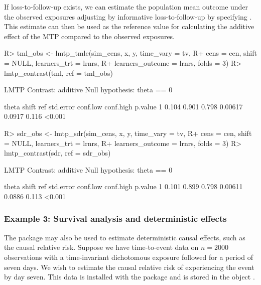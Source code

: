 \documentclass[]{jss}
\begin{document}
If loss-to-follow-up exists, we can estimate the population mean
outcome under the observed exposures adjusting by informative
loss-to-follow-up by specifying . This estimate can
then be used as the reference value for calculating the additive
effect of the MTP compared to the observed exposures.

\begin{CodeChunk}

\begin{CodeInput}
R> tml_obs <- lmtp_tmle(sim_cens, x, y, time_vary = tv, 
R+                      cens = cen, shift = NULL, learners_trt = lrnrs, 
R+                      learners_outcome = lrnrs, folds = 3)
R> lmtp_contrast(tml, ref = tml_obs)
\end{CodeInput}

\begin{CodeOutput}
  LMTP Contrast: additive
Null hypothesis: theta == 0

  theta shift   ref std.error conf.low conf.high p.value
1 0.104 0.901 0.798   0.00617   0.0917     0.116  <0.001
\end{CodeOutput}

\begin{CodeInput}
R> sdr_obs <- lmtp_sdr(sim_cens, x, y, time_vary = tv, 
R+                     cens = cen, shift = NULL, learners_trt = lrnrs, 
R+                     learners_outcome = lrnrs, folds = 3)
R> lmtp_contrast(sdr, ref = sdr_obs)
\end{CodeInput}

\begin{CodeOutput}
  LMTP Contrast: additive
Null hypothesis: theta == 0

  theta shift   ref std.error conf.low conf.high p.value
1 0.101 0.899 0.798   0.00611   0.0886     0.113  <0.001
\end{CodeOutput}

\end{CodeChunk}

\hypertarget{example-3-survival-analysis-and-deterministic-effects}{%
\subsubsection{Example 3: Survival analysis and deterministic effects}\label{example-3-survival-analysis-and-deterministic-effects}}

The  package may also be used to estimate deterministic causal effects, such as the causal relative risk.
Suppose we have time-to-event data on \(n = 2000\) observations with a time-invariant dichotomous exposure followed for a
period of seven days. We wish to estimate the causal relative risk of experiencing the event by day seven. This data is
installed with the package and is stored in the object . 
\end{document}
